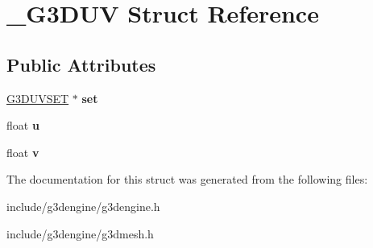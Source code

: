 \hypertarget{struct__G3DUV}{}\section{\+\_\+\+G3\+D\+UV Struct Reference}
\label{struct__G3DUV}
\subsection*{Public Attributes}
\begin{DoxyCompactItemize}
\item 
\mbox{\label{struct__G3DUV_a00618b29df9635a9dda627e4c2c03567}} 
\hyperlink{struct__G3DUVSET}{G3\+D\+U\+V\+S\+ET} $\ast$ {\bfseries set}
\item 
\mbox{\label{struct__G3DUV_af7aa2a980a17562e1b3f1ff702e219d0}} 
float {\bfseries u}
\item 
\mbox{\label{struct__G3DUV_a63a308394c1f262a46b774aac7a7a3c4}} 
float {\bfseries v}
\end{DoxyCompactItemize}


The documentation for this struct was generated from the following files\+:\begin{DoxyCompactItemize}
\item 
include/g3dengine/g3dengine.\+h\item 
include/g3dengine/g3dmesh.\+h\end{DoxyCompactItemize}
